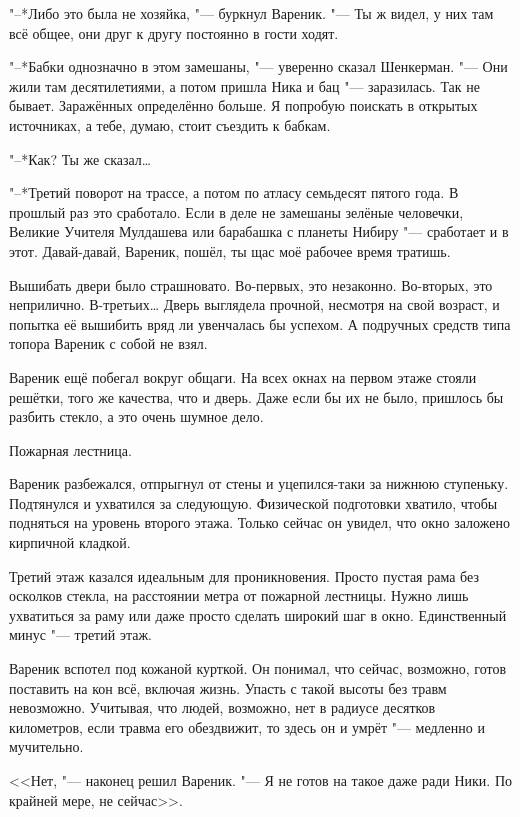 "--*Либо это была не хозяйка, "--- буркнул Вареник.
"--- Ты ж видел, у них там всё общее, они друг к другу постоянно в гости ходят.

"--*Бабки однозначно в этом замешаны, "--- уверенно сказал Шенкерман.
"--- Они жили там десятилетиями, а потом пришла Ника и бац "--- заразилась.
Так не бывает.
Заражённых определённо больше.
Я попробую поискать в открытых источниках, а тебе, думаю, стоит съездить к бабкам.

"--*Как?
Ты же сказал\ldots{}

"--*Третий поворот на трассе, а потом по атласу семьдесят пятого года.
В прошлый раз это сработало.
Если в деле не замешаны зелёные человечки, Великие Учителя Мулдашева или барабашка с планеты Нибиру "--- сработает и в этот.
Давай-давай, Вареник, пошёл, ты щас моё рабочее время тратишь.

\asterism

\textspace

Вышибать двери было страшновато.
Во-первых, это незаконно.
Во-вторых, это неприлично.
В-третьих\ldots{}
Дверь выглядела прочной, несмотря на свой возраст, и попытка её вышибить вряд ли увенчалась бы успехом.
А подручных средств типа топора Вареник с собой не взял.

Вареник ещё побегал вокруг общаги.
На всех окнах на первом этаже стояли решётки, того же качества, что и дверь.
Даже если бы их не было, пришлось бы разбить стекло, а это очень шумное дело.

Пожарная лестница.

Вареник разбежался, отпрыгнул от стены и уцепился-таки за нижнюю ступеньку.
Подтянулся и ухватился за следующую.
Физической подготовки хватило, чтобы подняться на уровень второго этажа.
Только сейчас он увидел, что окно заложено кирпичной кладкой.

Третий этаж казался идеальным для проникновения.
Просто пустая рама без осколков стекла, на расстоянии метра от пожарной лестницы.
Нужно лишь ухватиться за раму или даже просто сделать широкий шаг в окно.
Единственный минус "--- третий этаж.

Вареник вспотел под кожаной курткой.
Он понимал, что сейчас, возможно, готов поставить на кон всё, включая жизнь.
Упасть с такой высоты без травм невозможно.
Учитывая, что людей, возможно, нет в радиусе десятков километров, если травма его обездвижит, то здесь он и умрёт "--- медленно и мучительно.

<<Нет, "--- наконец решил Вареник.
"--- Я не готов на такое даже ради Ники.
По крайней мере, не сейчас>>.

